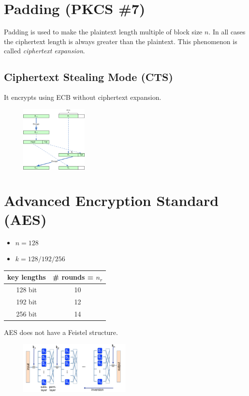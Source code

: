 \documentclass[a4paper,12pt]{article}
\begin{document}
\section{Padding (PKCS \#7)}
Padding is used to make the plaintext length multiple of block size $n$. In all cases the ciphertext length is always greater than the plaintext. This phenomenon is called \textit{ciphertext expansion}.

\subsection{Ciphertext Stealing Mode (CTS)}
It encrypts using ECB without ciphertext expansion.

\begin{figure}[H]
  \centering
  \includegraphics[width=0.3\textwidth]{img/cts}
\end{figure}


\section{Advanced Encryption Standard (AES)}
\begin{itemize}
	\item $n = 128$
	\item $k = 128/192/256$
\end{itemize}

\begin{center}
\begin{tabular}{ c | c }
key lengths & \# rounds = $n_r$ \\
\hline
128 bit & 10 \\ 
192 bit & 12 \\  
256 bit & 14    
\end{tabular}
\end{center}

AES does not have a Feistel structure. 

\begin{figure}[H]
  \centering
  \includegraphics[width=0.5\textwidth]{img/aes}
\end{figure}
\end{document}
